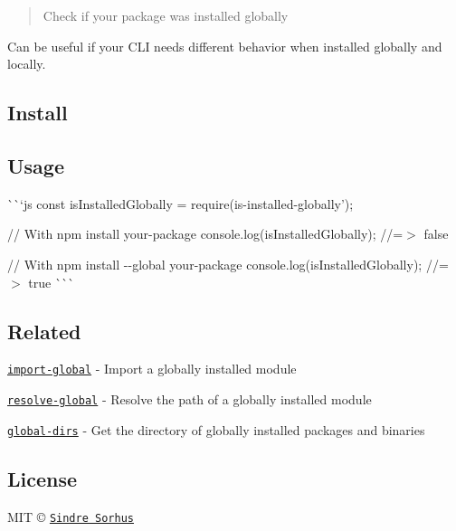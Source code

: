 \begin{quote}
Check if your package was installed globally \end{quote}


Can be useful if your C\+LI needs different behavior when installed globally and locally.

\subsection*{Install}




\subsection*{Usage}

\`{}\`{}`js const is\+Installed\+Globally = require(\textquotesingle{}is-\/installed-\/globally');

// With {\ttfamily npm install your-\/package} console.\+log(is\+Installed\+Globally); //=$>$ false

// With {\ttfamily npm install -\/-\/global your-\/package} console.\+log(is\+Installed\+Globally); //=$>$ true \`{}\`{}\`{}

\subsection*{Related}


\begin{DoxyItemize}
\item \href{https://github.com/sindresorhus/import-global}{\tt import-\/global} -\/ Import a globally installed module
\item \href{https://github.com/sindresorhus/resolve-global}{\tt resolve-\/global} -\/ Resolve the path of a globally installed module
\item \href{https://github.com/sindresorhus/global-dirs}{\tt global-\/dirs} -\/ Get the directory of globally installed packages and binaries
\end{DoxyItemize}

\subsection*{License}

M\+IT © \href{https://sindresorhus.com}{\tt Sindre Sorhus} 